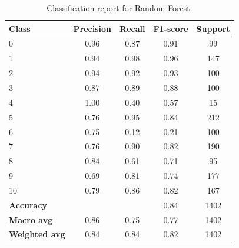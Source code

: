 \begin{table}[h]
    \centering
    \begin{tabular}{lcccc}
        \toprule
        \textbf{Class} & \textbf{Precision} & \textbf{Recall} & \textbf{F1-score} & \textbf{Support} \\
        \midrule
        0 & 0.96 & 0.87 & 0.91 & 99 \\
        1 & 0.94 & 0.98 & 0.96 & 147 \\
        2 & 0.94 & 0.92 & 0.93 & 100 \\
        3 & 0.87 & 0.89 & 0.88 & 100 \\
        4 & 1.00 & 0.40 & 0.57 & 15 \\
        5 & 0.76 & 0.95 & 0.84 & 212 \\
        6 & 0.75 & 0.12 & 0.21 & 100 \\
        7 & 0.76 & 0.90 & 0.82 & 190 \\
        8 & 0.84 & 0.61 & 0.71 & 95 \\
        9 & 0.69 & 0.81 & 0.74 & 177 \\
        10 & 0.79 & 0.86 & 0.82 & 167 \\
        \midrule
        \textbf{Accuracy} & & & 0.84 & 1402 \\
        \textbf{Macro avg} & 0.86 & 0.75 & 0.77 & 1402 \\
        \textbf{Weighted avg} & 0.84 & 0.84 & 0.82 & 1402 \\
        \bottomrule
    \end{tabular}
    \caption{Classification report for Random Forest.}
    \label{tab:classification_report_rf}
\end{table}


